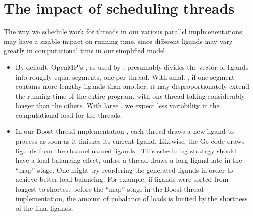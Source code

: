 \documentclass[letterpaper,10pt,openany,oneside]{sphinxmanual}
\begin{document}
\section{The impact of scheduling threads}
\label{evaluation/evaluation:the-impact-of-scheduling-threads}
The way we schedule work for threads in our various parallel implmenentations may have a sizable impact on running time, since different ligands may vary greatly in computational time in our simplified model.
\begin{itemize}
\item {} 
By default, OpenMP’s , as used by , presumably divides the vector of ligands into roughly equal segments, one per thread. With small , if one segment contains more lengthy ligands than another, it may disproportionately extend the running time of the entire program, with one thread taking considerably longer than the others. With large , we expect less variability in the computational load for the threads.

\item {} 
In our Boost thread implementation , each thread draws a new ligand to process as soon as it finishes its current ligand. Likewise, the Go code  draws ligands from the channel named  ligands . This scheduling strategy should have a load-balancing effect, unless a thread draws a long ligand late in the “map” stage. One might try reordering the generated ligands in order to achieve better load balancing. For example, if ligands were sorted from longest to shortest before the “map” stage in the Boost thread implementation, the amount of imbalance of loads is limited by the shortness of the final ligands.

\end{itemize}
\end{document}
